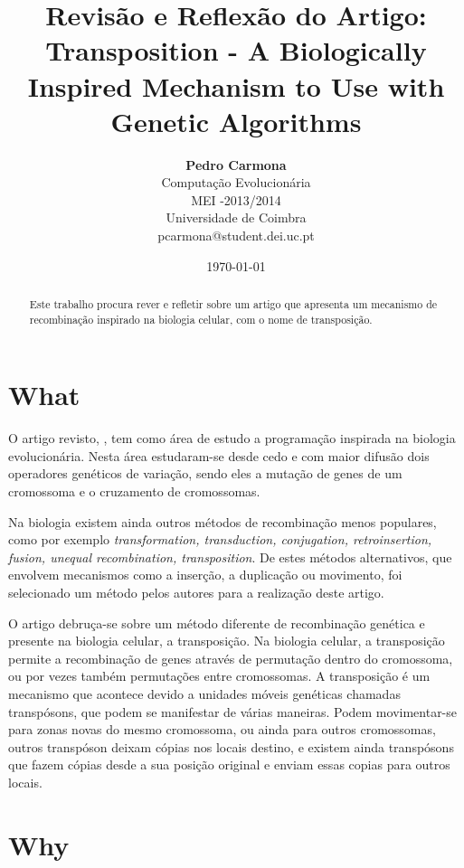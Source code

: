 \documentclass[12pt,portuguese,a4paper]{article}
\title{\LARGE{\textbf{Revisão e Reflexão do Artigo:}}\\ Transposition - A Biologically Inspired Mechanism to Use with Genetic Algorithms \cite{Simoes99transposition:a}}
\author{ \textbf{Pedro Carmona} \\ Computação Evolucionária\\ MEI -2013/2014 \\ Universidade de Coimbra \\ pcarmona@student.dei.uc.pt}
\date{\today}
\begin{document}
\maketitle

\begin{abstract}
Este trabalho procura rever e refletir sobre um artigo que apresenta um mecanismo de recombinação inspirado na biologia celular, com o nome de transposição.
\end{abstract}

\section{What}


O artigo revisto, \cite{Simoes99transposition:a}, tem como área de estudo a programação inspirada na biologia evolucionária.
Nesta área estudaram-se desde cedo e com maior difusão dois operadores genéticos de variação, sendo eles a mutação de genes de um cromossoma e o cruzamento de cromossomas.

Na biologia existem ainda outros métodos de recombinação menos populares, como por exemplo \textit{transformation, transduction, conjugation, retroinsertion, fusion, unequal recombination, transposition}\cite{Simoes99transposition:a}. De estes métodos alternativos, que envolvem mecanismos como a inserção, a duplicação ou movimento, foi selecionado um método pelos autores para a realização deste artigo.

O artigo debruça-se sobre um método diferente de recombinação genética e presente na biologia celular, a transposição.
Na biologia celular, a transposição permite a recombinação de genes através de permutação dentro do cromossoma, ou por vezes também permutações entre cromossomas.
A transposição é um mecanismo que acontece devido a unidades móveis genéticas chamadas transpósons, que podem se manifestar de várias maneiras. Podem movimentar-se para zonas novas do mesmo cromossoma, ou ainda para outros cromossomas, outros transpóson deixam cópias nos locais destino, e existem ainda transpósons que fazem cópias desde a sua posição original e enviam essas copias para outros locais.


\section{Why}
\end{document}
